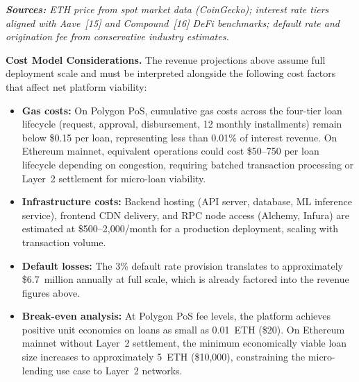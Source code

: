 \documentclass[12pt,a4paper]{report}
\begin{document}
\vspace{4pt}
\noindent\textit{\small\textbf{Sources:} ETH price from spot market data (CoinGecko); interest rate tiers aligned with Aave~[15] and Compound~[16] DeFi benchmarks; default rate and origination fee from conservative industry estimates.}

\vspace{6pt}
\noindent\textbf{Cost Model Considerations.} The revenue projections above assume full deployment scale and must be interpreted alongside the following cost factors that affect net platform viability:

\begin{itemize}[noitemsep]
\item \textbf{Gas costs:} On Polygon PoS, cumulative gas costs across the four-tier loan lifecycle (request, approval, disbursement, 12 monthly installments) remain below \$0.15 per loan, representing less than 0.01\% of interest revenue. On Ethereum mainnet, equivalent operations could cost \$50--750 per loan lifecycle depending on congestion, requiring batched transaction processing or Layer~2 settlement for micro-loan viability.
\item \textbf{Infrastructure costs:} Backend hosting (API server, database, ML inference service), frontend CDN delivery, and RPC node access (Alchemy, Infura) are estimated at \$500--2,000/month for a production deployment, scaling with transaction volume.
\item \textbf{Default losses:} The 3\% default rate provision translates to approximately \$6.7~million annually at full scale, which is already factored into the revenue figures above.
\item \textbf{Break-even analysis:} At Polygon PoS fee levels, the platform achieves positive unit economics on loans as small as 0.01~ETH (\$20). On Ethereum mainnet without Layer~2 settlement, the minimum economically viable loan size increases to approximately 5~ETH (\$10,000), constraining the micro-lending use case to Layer~2 networks.
\end{itemize}
\end{document}
